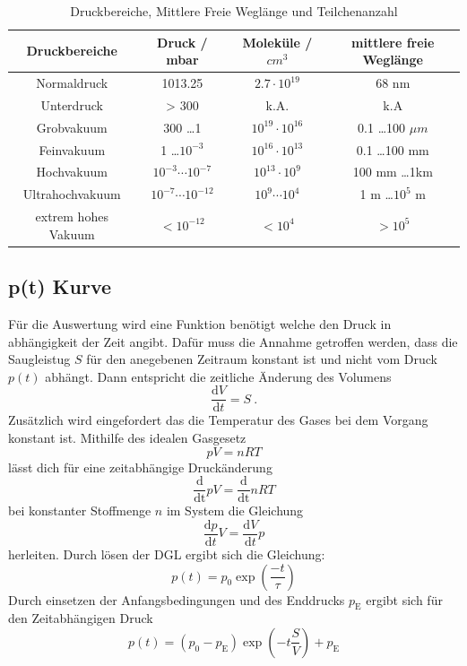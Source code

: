 \begin{table}
  \centering
  \caption{Druckbereiche, Mittlere Freie Weglänge und Teilchenanzahl}
  \begin{tabular}{c|c c c}
  	\toprule
	Druckbereiche & Druck / mbar & Moleküle / $cm^3$ & mittlere freie Weglänge \\
	\midrule
	Normaldruck	& 1013.25			& $2.7 \cdot 10^{19}$ &	68 nm \\
	Unterdruck	& > 300				& k.A. & k.A \\
	Grobvakuum	& 300 \ldots 1 			&$10^{19} \cdot 10^{16}$&0.1 \ldots 100 $\mu m$ \\
	Feinvakuum	& 1 \ldots $10^{-3}$		& $10^{16} \cdot 10^{13}$ & 0.1 \ldots 100 mm \\
	Hochvakuum	& $10^{-3} \cdots 10^{-7}$	& $10^{13} \cdot 10^{9}$ & 100 mm \ldots 1km \\
	Ultrahochvakuum	& $10^{-7} \cdots 10^{-12}$	& $10^9 \cdots 10^4$ & 1 m \ldots $10^5$ m \\
	extrem hohes Vakuum & $< 10^{-12}$		& $<10^4$ & $> 10^5$ \\
	\bottomrule
  \end{tabular}
  \label{tab:ueberblick}
\end{table}


\subsection{p(t) Kurve}
Für die Auswertung wird eine Funktion benötigt welche den Druck in abhängigkeit der Zeit angibt. Dafür muss die Annahme getroffen werden, dass die Saugleistug $S$ für den anegebenen Zeitraum konstant ist und nicht vom Druck $p(t)$ abhängt. Dann entspricht die zeitliche Änderung des Volumens 
\begin{equation}
  \frac{\text{d}V}{\text{d}t} = S \ .
\end{equation}
Zusätzlich wird eingefordert das die Temperatur des Gases bei dem Vorgang konstant ist. Mithilfe des idealen Gasgesetz
\begin{equation}
  p V = n R T
\end{equation}
lässt dich für eine zeitabhängige Druckänderung
\begin{equation}
  \frac{\text{d}}{\text{dt}} pV = \frac{\text{d}}{\text{dt}} n R T
\end{equation}
bei konstanter Stoffmenge $n$ im System die Gleichung 
\begin{equation}
  \frac{\text{d}p}{\text{d}t} V= \frac{\text{d}V}{\text{d}t} p
  \label{eqn:konti}
\end{equation}
herleiten. Durch lösen der DGL ergibt sich die Gleichung:
\begin{equation}
  p(t) = p_0 \exp \left( \frac{-t}{\tau} \right)
\end{equation}
Durch einsetzen der Anfangsbedingungen und des Enddrucks $p_\text{E}$ ergibt sich für den Zeitabhängigen Druck 
\begin{equation}
  p(t) = (p_0 - p_\text{E}) \exp \left( -t \frac{S}{V} \right) + p_\text{E}
\end{equation}
